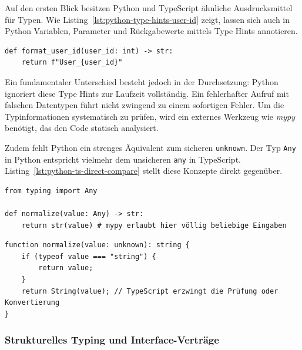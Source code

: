 Auf den ersten Blick besitzen Python und TypeScript ähnliche Ausdrucksmittel für Typen. Wie Listing~\ref{lst:python-type-hints-user-id} zeigt, lassen sich auch in Python Variablen, Parameter und Rückgabewerte mittels Type Hints annotieren.

\begin{listing}[htbp]
    \caption{Type Hints in Python}
    \label{lst:python-type-hints-user-id}
    \begin{verbatim}
def format_user_id(user_id: int) -> str:
    return f"User_{user_id}"
    \end{verbatim}
\end{listing}

Ein fundamentaler Unterschied besteht jedoch in der Durchsetzung: Python ignoriert diese Type Hints zur Laufzeit vollständig. Ein fehlerhafter Aufruf mit falschen Datentypen führt nicht zwingend zu einem sofortigen Fehler. Um die Typinformationen systematisch zu prüfen, wird ein externes Werkzeug wie \textit{mypy} benötigt, das den Code statisch analysiert.

Zudem fehlt Python ein strenges Äquivalent zum sicheren \texttt{unknown}. Der Typ \texttt{Any} in Python entspricht vielmehr dem unsicheren \texttt{any} in TypeScript. Listing~\ref{lst:python-ts-direct-compare} stellt diese Konzepte direkt gegenüber.

\begin{listing}[htbp]
    \caption{Python \texttt{Any} vs. TypeScript \texttt{unknown}}
    \label{lst:python-ts-direct-compare}
    \begin{verbatim}
from typing import Any

def normalize(value: Any) -> str:
    return str(value) # mypy erlaubt hier völlig beliebige Eingaben
    \end{verbatim}
        
    \begin{verbatim}
function normalize(value: unknown): string {
    if (typeof value === "string") {
        return value;
    }
    return String(value); // TypeScript erzwingt die Prüfung oder Konvertierung
}
    \end{verbatim}
\end{listing}


\subsubsection{Strukturelles Typing und Interface-Verträge}
\label{subsubsec:interfaces-strukturell}

